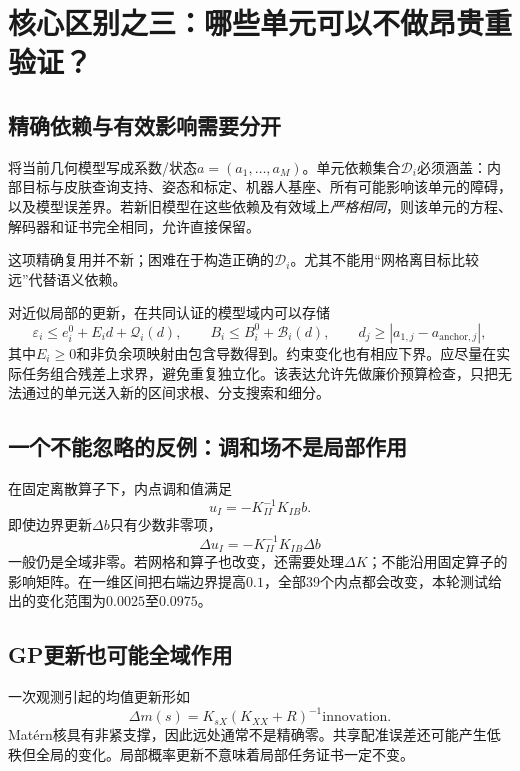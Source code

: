 \documentclass[UTF8,11pt,a4paper,fontset=fandol]{ctexart}
\numberwithin{equation}{section}
\theoremstyle{definition}
\begin{document}
\section{核心区别之三：哪些单元可以不做昂贵重验证？}
\subsection{精确依赖与有效影响需要分开}
将当前几何模型写成系数/状态$a=(a_1,\ldots,a_M)$。单元依赖集合$\mathcal D_i$必须涵盖：内部目标与皮肤查询支持、姿态和标定、机器人基座、所有可能影响该单元的障碍，以及模型误差界。若新旧模型在这些依赖及有效域上\emph{严格相同}，则该单元的方程、解码器和证书完全相同，允许直接保留。

这项精确复用并不新；困难在于构造正确的$\mathcal D_i$。尤其不能用“网格离目标比较远”代替语义依赖。

对近似局部的更新，在共同认证的模型域内可以存储
\begin{equation}
 \varepsilon_i\le e_i^0+E_i d+\mathcal Q_i(d),
 \qquad
 B_i\le B_i^0+\mathcal B_i(d),
 \qquad d_j\ge|a_{1,j}-a_{\mathrm{anchor},j}|,
 \label{eq:influence}
\end{equation}
其中$E_i\ge0$和非负余项映射由包含导数得到。约束变化也有相应下界。应尽量在实际任务组合残差上求界，避免重复独立化。该表达允许先做廉价预算检查，只把无法通过的单元送入新的区间求根、分支搜索和细分。

\subsection{一个不能忽略的反例：调和场不是局部作用}
在固定离散算子下，内点调和值满足
\begin{equation}
 u_I=-K_{II}^{-1}K_{IB}b.
\end{equation}
即使边界更新$\Delta b$只有少数非零项，
\begin{equation}
 \Delta u_I=-K_{II}^{-1}K_{IB}\Delta b
\end{equation}
一般仍是全域非零。若网格和算子也改变，还需要处理$\Delta K$；不能沿用固定算子的影响矩阵。在一维区间把右端边界提高$0.1$，全部39个内点都会改变，本轮测试给出的变化范围为$0.0025$至$0.0975$。

\subsection{GP更新也可能全域作用}
一次观测引起的均值更新形如
\begin{equation}
 \Delta m(s)=K_{sX}(K_{XX}+R)^{-1}\mathrm{innovation}.
\end{equation}
Mat\'ern核具有非紧支撑，因此远处通常不是精确零。共享配准误差还可能产生低秩但全局的变化。局部概率更新不意味着局部任务证书一定不变。
\end{document}
